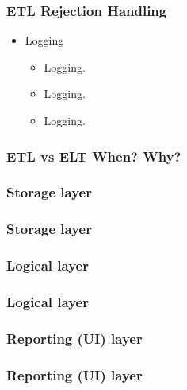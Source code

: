 
\begin{frame}
    \frametitle{ETL Rejection Handling}
    \begin{itemize}[<+->]
        \item Logging
        \begin{itemize}[<+->]
            \item  Logging.
            \item  Logging.
            \item  Logging.


        \end{itemize}
    \end{itemize}
\end{frame}


\begin{frame}
    \frametitle{ETL vs ELT When? Why?}
\end{frame}

\subsubsection{Storage layer}

\begin{frame}
    \frametitle{Storage layer}
\end{frame}
\subsubsection{Logical layer}

\begin{frame}
    \frametitle{Logical layer}
\end{frame}

\subsubsection{Reporting (UI) layer}

\begin{frame}
    \frametitle{Reporting (UI) layer}
\end{frame}


